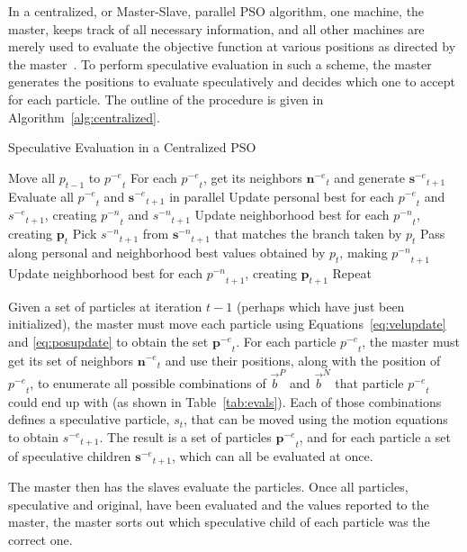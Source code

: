 \documentclass[journal,letterpaper]{IEEEtran}
\newcommand{\alg}[1]{Algorithm~\ref{alg:#1}}
\providecommand{\pers}{\ensuremath{P}}
\providecommand{\neigh}{\ensuremath{N}}
\providecommand{\nbest}{\ensuremath{\Vec{b}^\neigh}}
\providecommand{\pbest}{\ensuremath{\Vec{b}^\pers}}
\providecommand{\noeval}[1]{\ensuremath{#1^{-e}}}
\providecommand{\nonbest}[1]{\ensuremath{#1^{-n}}}
\providecommand{\p}{\ensuremath{p}}
\providecommand{\pset}{\ensuremath{\mathbf{p}}}
\providecommand{\s}{\ensuremath{s}}
\providecommand{\sset}{\ensuremath{\mathbf{s}}}
\providecommand{\nset}{\ensuremath{\mathbf{n}}}
\begin{document}
In a centralized, or Master-Slave, parallel PSO algorithm, one machine, the
master, keeps track of all necessary information, and all other machines are
merely used to evaluate the objective function at various positions as directed
by the master~\cite{belal-ijicis04}.  To perform speculative evaluation in such
a scheme, the master generates the positions to evaluate speculatively and
decides which one to accept for each particle.  The outline of the procedure is
given in \alg{centralized}.

\begin{algorithm}
  \caption{Speculative Evaluation in a Centralized PSO}
  \label{alg:centralized}
  \begin{algorithmic}[1]
	\STATE Move all $\p_{t-1}$ to $\noeval{\p}_t$
	\STATE For each $\noeval{\p}_t$, get its neighbors $\noeval{\nset}_t$ and
	  generate $\noeval{\sset}_{t+1}$
	\STATE Evaluate all $\noeval{\p}_t$ and $\noeval{\sset}_{t+1}$ in parallel
	\STATE Update personal best for each $\noeval{\p}_t$ and
	  $\noeval{\s}_{t+1}$, creating $\nonbest{\p}_t$ and $\nonbest{\s}_{t+1}$
	\STATE Update neighborhood best for each $\nonbest{\p}_t$, creating
	  $\pset_t$
	\FORALL{$\p_t$}
	\STATE Pick $\nonbest{\s}_{t+1}$ from $\nonbest{\sset}_{t+1}$ that matches
	  the branch taken by $\p_t$
	\STATE Pass along personal and neighborhood best values obtained by $\p_t$,
	  making $\nonbest{\p}_{t+1}$
	\ENDFOR
	\STATE Update neighborhood best for each $\nonbest{\p}_{t+1}$, creating
	  $\pset_{t+1}$
	\STATE Repeat
  \end{algorithmic}
\end{algorithm}

Given a set of particles at iteration $t-1$ (perhaps which have just been
initialized), the master must move each particle using
Equations~\eqref{eq:velupdate} and \eqref{eq:posupdate} to obtain the set
$\noeval{\pset}_t$.  For each particle $\noeval{\p}_t$, the master must get its
set of neighbors $\noeval{\nset}_t$ and use their positions, along with the
position of $\noeval{\p}_t$, to enumerate all possible combinations of $\pbest$
and $\nbest$ that particle $\noeval{\p}_t$ could end up with (as shown in
Table~\ref{tab:evals}).  Each of those combinations defines a speculative
particle, $\s_t$, that can be moved using the motion equations to obtain
$\noeval{\s}_{t+1}$.  The result is a set of particles $\noeval{\pset}_t$, and
for each particle a set of speculative children $\noeval{\sset}_{t+1}$, which
can all be evaluated at once.

The master then has the slaves evaluate the particles.  Once all particles,
speculative and original, have been evaluated and the values reported to the
master, the master sorts out which speculative child of each particle was the
correct one.
\end{document}
